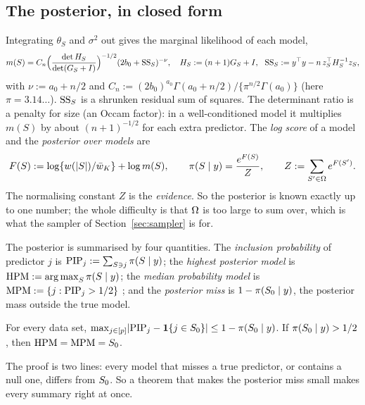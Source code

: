 \subsection{The posterior, in closed form}\label{sec:posterior}

Integrating $\theta_S$ and $\sigma^2$ out gives the marginal likelihood of each model,
\begin{equation}\label{eq:marglik}
  m(S)=C_n\Big(\frac{\det H_S}{\det(G_S+I)}\Big)^{-1/2}(2b_0+\mathrm{SS}_S)^{-\nu},\quad
  H_S:=(n+1)G_S+I,\ \ \mathrm{SS}_S:=y^\top y-n\,z_S^\top H_S^{-1}z_S,
\end{equation}
with $\nu:=a_0+n/2$ and $C_n:=(2b_0)^{a_0}\Gamma(a_0+n/2)/\{\pi^{n/2}\Gamma(a_0)\}$ (here $\pi=3.14\ldots$).
$\mathrm{SS}_S$ is a shrunken residual sum of squares. The determinant ratio is a penalty for size (an Occam factor): in a
well-conditioned model it multiplies $m(S)$ by about $(n+1)^{-1/2}$ for each extra predictor. The \emph{log score} of a
model and the \emph{posterior over models} are
\begin{equation}\label{eq:posterior}
  F(S):=\log\{w(\lvert S\rvert)/\bar w_K\}+\log m(S),\qquad \pi(S\mid y)=\frac{e^{F(S)}}{Z},\qquad Z:=\sum_{S'\in\Omega}e^{F(S')} .
\end{equation}
The normalising constant $Z$ is the \emph{evidence}. So the posterior is known exactly up to one number; the whole
difficulty is that $\Omega$ is too large to sum over, which is what the sampler of Section~\ref{sec:sampler} is for.

The posterior is summarised by four quantities. The \emph{inclusion probability} of predictor $j$ is
$\mathrm{PIP}_j:=\sum_{S\ni j}\pi(S\mid y)$; the \emph{highest posterior model} is $\mathrm{HPM}:=\operatorname*{arg\,max}_S\pi(S\mid y)$; the \emph{median
probability model} is $\mathrm{MPM}:=\{j:\mathrm{PIP}_j>1/2\}$ \citep{BarbieriBerger2004}; and the \emph{posterior miss} is
$1-\pi(S_0\mid y)$, the posterior mass outside the true model.

\begin{lemma}\label{lem:summaries}
For every data set, $\max_{j\in[p]}\lvert \mathrm{PIP}_j-\mathbf{1}\{j\in S_0\}\rvert\le1-\pi(S_0\mid y)$. If $\pi(S_0\mid y)>1/2$, then
$\mathrm{HPM}=\mathrm{MPM}=S_0$.
\end{lemma}

The proof is two lines: every model that misses a true predictor, or contains a null one, differs from $S_0$. So a
theorem that makes the posterior miss small makes every summary right at once.

